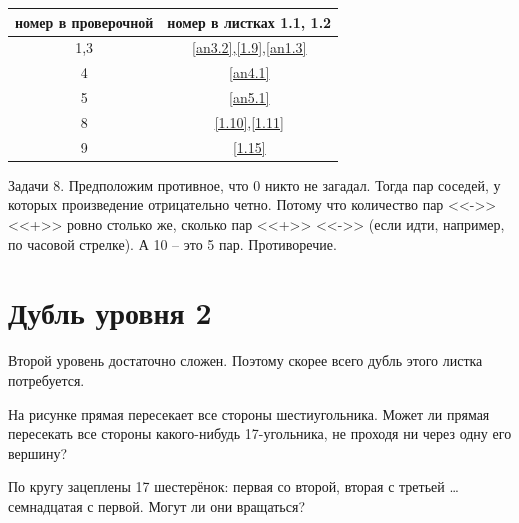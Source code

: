 \begin{table}[h]\centering
	\begin{tabular}{|c|c|}
		\hline
		номер в проверочной&номер в листках 1.1, 1.2\\
		\hline
		1,3&\ref{an3.2},\ref{1.9},\ref{an1.3}\\
		\hline
		4&\ref{an4.1}\\
		\hline
		5&\ref{an5.1}\\
		\hline
		8&\ref{1.10},\ref{1.11}\\
		\hline
		9&\ref{1.15}\\
		\hline
	\end{tabular}
\end{table}
\begin{prf}
	Задачи 8. Предположим противное, что 0 никто не загадал. Тогда пар соседей, у которых произведение отрицательно четно. Потому что количество пар <<->> <<+>> ровно столько же, сколько пар <<+>> <<->> (если идти, например, по часовой стрелке). А 10 -- это 5 пар. Противоречие.
\end{prf}

\section{Дубль уровня 2}

Второй уровень достаточно сложен. Поэтому скорее всего дубль этого листка потребуется.



\begin{thm}
	\label{f1}
	На рисунке прямая пересекает все стороны шестиугольника. Может ли прямая пересекать все стороны какого-нибудь 17-угольника, не проходя ни через одну его вершину?
\end{thm}


\begin{thm}
	По кругу зацеплены 17 шестерёнок: первая со второй, вторая с третьей \dots семнадцатая с первой. Могут ли они вращаться?
\end{thm}

